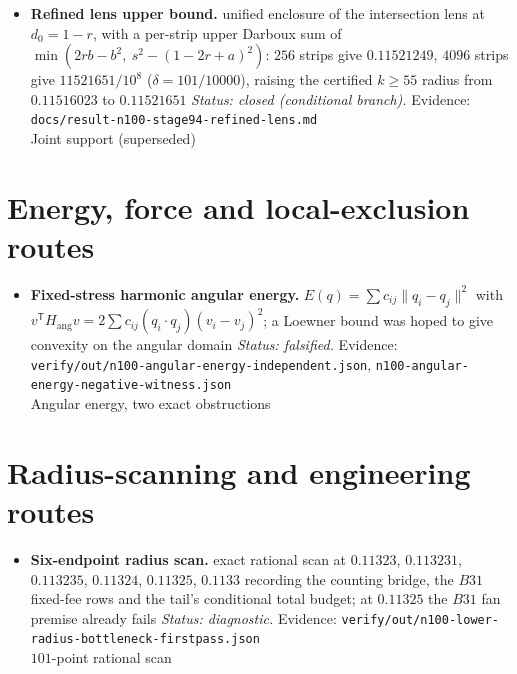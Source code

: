 \begin{itemize}[leftmargin=1.2em,itemsep=3pt]
\item \textbf{Refined lens upper bound.} unified enclosure of the intersection lens at $d_0=1-r$, with a per-strip
upper Darboux sum of $\min(2rb-b^2,\ s^2-(1-2r+a)^2)$: $256$ strips give $0.11521249$, $4096$ strips
give $11521651/10^{8}$ ($\delta=101/10000$), raising the certified $k\ge55$ radius from
$0.11516023$ to $0.11521651$ \emph{Status: closed (conditional branch).} Evidence: {\footnotesize\texttt{docs/\allowbreak{}result-\allowbreak{}n100-\allowbreak{}stage94-\allowbreak{}refined-\allowbreak{}lens.md}} \\
Joint support (superseded)
\end{itemize}


\section{Energy, force and local-exclusion routes}

\begin{itemize}[leftmargin=1.2em,itemsep=3pt]
\item \textbf{Fixed-stress harmonic angular energy.} $E(q)=\sum c_{ij}\|q_i-q_j\|^2$ with
$v^{\mathsf T}H_{\text{ang}}v=2\sum c_{ij}(q_i\cdot q_j)(v_i-v_j)^2$; a Loewner bound was hoped to
give convexity on the angular domain \emph{Status: falsified.} Evidence: {\footnotesize\texttt{verify/\allowbreak{}out/\allowbreak{}n100-\allowbreak{}angular-\allowbreak{}energy-\allowbreak{}independent.json}},
\texttt{n100-\allowbreak{}angular-\allowbreak{}energy-\allowbreak{}negative-\allowbreak{}witness.json} \\
Angular energy, two exact obstructions
\end{itemize}


\section{Radius-scanning and engineering routes}

\begin{itemize}[leftmargin=1.2em,itemsep=3pt]
\item \textbf{Six-endpoint radius scan.} exact rational scan at $0.11323$, $0.113231$, $0.113235$, $0.11324$,
$0.11325$, $0.1133$ recording the counting bridge, the $B31$ fixed-fee rows and the tail's
conditional total budget; at $0.11325$ the $B31$ fan premise already fails \emph{Status: diagnostic.} Evidence: {\footnotesize\texttt{verify/\allowbreak{}out/\allowbreak{}n100-\allowbreak{}lower-\allowbreak{}radius-\allowbreak{}bottleneck-\allowbreak{}firstpass.json}} \\
$101$-point rational scan
\end{itemize}


